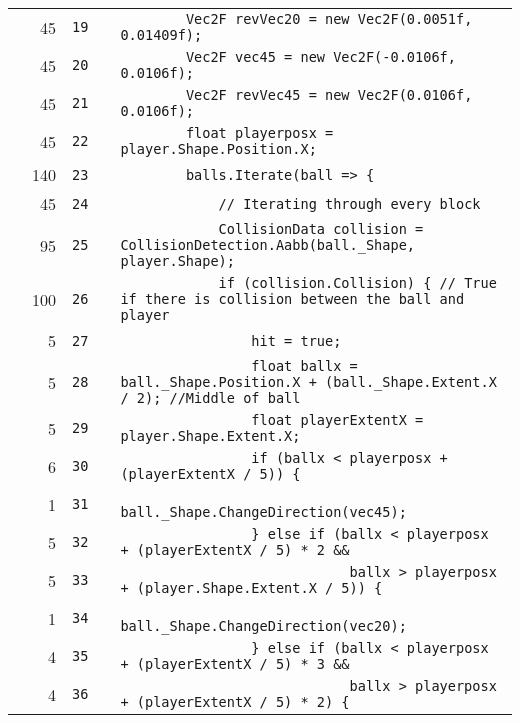 \documentclass[a4paper,landscape,10pt]{article}
\begin{document}
\begin{longtable}[l]{lrrll}
\cellcolor{green} & 45 & \verb~19~ & & \verb~        Vec2F revVec20 = new Vec2F(0.0051f, 0.01409f);~\\
\cellcolor{green} & 45 & \verb~20~ & & \verb~        Vec2F vec45 = new Vec2F(-0.0106f, 0.0106f);~\\
\cellcolor{green} & 45 & \verb~21~ & & \verb~        Vec2F revVec45 = new Vec2F(0.0106f, 0.0106f);~\\
\cellcolor{green} & 45 & \verb~22~ & & \verb~        float playerposx = player.Shape.Position.X;~\\
\cellcolor{green} & 140 & \verb~23~ & & \verb~        balls.Iterate(ball => {~\\
\cellcolor{green} & 45 & \verb~24~ & & \verb~            // Iterating through every block~\\
\cellcolor{green} & 95 & \verb~25~ & & \verb~            CollisionData collision = CollisionDetection.Aabb(ball._Shape, player.Shape);~\\
\cellcolor{green} & 100 & \verb~26~ & & \verb~            if (collision.Collision) { // True if there is collision between the ball and player~\\
\cellcolor{green} & 5 & \verb~27~ & & \verb~                hit = true;~\\
\cellcolor{green} & 5 & \verb~28~ & & \verb~                float ballx = ball._Shape.Position.X + (ball._Shape.Extent.X / 2); //Middle of ball~\\
\cellcolor{green} & 5 & \verb~29~ & & \verb~                float playerExtentX = player.Shape.Extent.X;~\\
\cellcolor{green} & 6 & \verb~30~ & & \verb~                if (ballx < playerposx + (playerExtentX / 5)) {~\\
\cellcolor{green} & 1 & \verb~31~ & & \verb~                    ball._Shape.ChangeDirection(vec45);~\\
\cellcolor{green} & 5 & \verb~32~ & & \verb~                } else if (ballx < playerposx + (playerExtentX / 5) * 2 &&~\\
\cellcolor{green} & 5 & \verb~33~ & & \verb~                            ballx > playerposx + (player.Shape.Extent.X / 5)) {~\\
\cellcolor{green} & 1 & \verb~34~ & & \verb~                    ball._Shape.ChangeDirection(vec20);~\\
\cellcolor{green} & 4 & \verb~35~ & & \verb~                } else if (ballx < playerposx + (playerExtentX / 5) * 3 &&~\\
\cellcolor{green} & 4 & \verb~36~ & & \verb~                            ballx > playerposx + (playerExtentX / 5) * 2) {~\\

\end{longtable}
\end{document}
